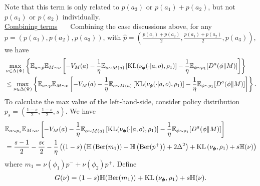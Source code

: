 Note that this term is only related to $p(a_3)$ or $p(a_1)+p(a_2)$, but not $p(a_1)$ or $p(a_2)$ individually. \\

\noindent\underline{Combining terms} \ \ \ 
Combining the case discussions above, for any $p = (p(a_1), p(a_2), p(a_3))$, with $\hat{p} = (\frac{p(a_1) + p(a_2)}{2}, \frac{p(a_1) + p(a_2)}{2}, p(a_3))$, we have
\begin{align*}
    &\max_{\nu \in \Delta(\Psi)}\left\{\mathbb{E}_{a\sim \hat{p}} \mathbb{E}_{M\sim \nu} \left[-V_M (a) - \frac{1}{\eta}\mathbb{E}_{o\sim M(a)}\left[\text{KL}(\nu_{\pmb{\phi}}(\cdot|a, o), \rho_1)\right]-\frac{1}{\eta}\mathbb{E}_{\phi\sim \rho_1}[D^a(\phi\|M)]\right]\right\}  
    \\&\le \max_{\nu \in \Delta(\Psi)}\left\{\mathbb{E}_{a\sim p} \mathbb{E}_{M\sim \nu} \left[-V_M (a)- \frac{1}{\eta}\mathbb{E}_{o\sim M(a)}\left[\text{KL}(\nu_{\pmb{\phi}}(\cdot|a, o), \rho_1)\right]-\frac{1}{\eta}\mathbb{E}_{\phi\sim \rho_1}[D^a(\phi\|M)]\right]\right\}. 
\end{align*}
To calculate the max value of the left-hand-side,  consider policy distribution $p_s = (\frac{1-s}{2}, \frac{1-s}{2}, s)$. We have
\begin{align}
    &\mathbb{E}_{a\sim p_s} \mathbb{E}_{M\sim \nu} \left[-V_M (a) - \frac{1}{\eta}\mathbb{E}_{o\sim M(a)}\left[\text{KL}(\nu_{\pmb{\phi}}(\cdot|a, o), \rho_1)\right]-\frac{1}{\eta}\mathbb{E}_{\phi\sim \rho_1}[D^a(\phi\|M)]\right] \nonumber
    \\&= \frac{s-1}{2}-\frac{s\epsilon}{2} -\frac{1}{\eta}\left( \left(1-s\right)\left(\mathbb{H}\left(\text{Ber}(m_1)\right) - \mathbb{H}\left(\text{Ber}(p^+)\right) + 2\Delta^2\right) +  \text{KL}\left(\nu_{\pmb{\phi}}, \rho_1\right) + s\mathbb{H}(\nu) \right) \label{eq: G_init}
\end{align}
where $m_1 = \nu(\phi_1)p^{-} +  \nu(\phi_2)p^{+}$. Define
\begin{align*}
    G(\nu) = (1-s)\mathbb{H}(\text{Ber}(m_1)) + \text{KL}\left(\nu_{\pmb{\phi}}, \rho_1\right) + s\mathbb{H}(\nu). 
\end{align*}


